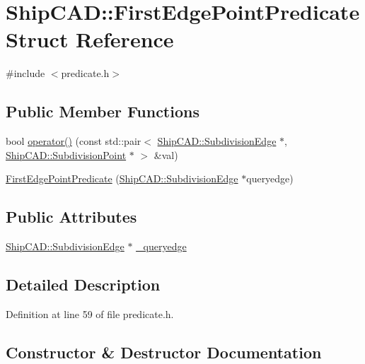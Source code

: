 \hypertarget{structShipCAD_1_1FirstEdgePointPredicate}{}\section{Ship\+C\+AD\+:\+:First\+Edge\+Point\+Predicate Struct Reference}
\label{structShipCAD_1_1FirstEdgePointPredicate}


{\ttfamily \#include $<$predicate.\+h$>$}

\subsection*{Public Member Functions}
\begin{DoxyCompactItemize}
\item 
bool \hyperlink{structShipCAD_1_1FirstEdgePointPredicate_af500f152d681fdb26f88f43ea2c15e58}{operator()} (const std\+::pair$<$ \hyperlink{classShipCAD_1_1SubdivisionEdge}{Ship\+C\+A\+D\+::\+Subdivision\+Edge} $\ast$, \hyperlink{classShipCAD_1_1SubdivisionPoint}{Ship\+C\+A\+D\+::\+Subdivision\+Point} $\ast$ $>$ \&val)
\item 
\hyperlink{structShipCAD_1_1FirstEdgePointPredicate_af7344b1253f796802c83bd24c6e34d12}{First\+Edge\+Point\+Predicate} (\hyperlink{classShipCAD_1_1SubdivisionEdge}{Ship\+C\+A\+D\+::\+Subdivision\+Edge} $\ast$queryedge)
\end{DoxyCompactItemize}
\subsection*{Public Attributes}
\begin{DoxyCompactItemize}
\item 
\hyperlink{classShipCAD_1_1SubdivisionEdge}{Ship\+C\+A\+D\+::\+Subdivision\+Edge} $\ast$ \hyperlink{structShipCAD_1_1FirstEdgePointPredicate_a742e86c0109e10e3fe5482066fc31dc5}{\+\_\+queryedge}
\end{DoxyCompactItemize}


\subsection{Detailed Description}


Definition at line 59 of file predicate.\+h.



\subsection{Constructor \& Destructor Documentation}
